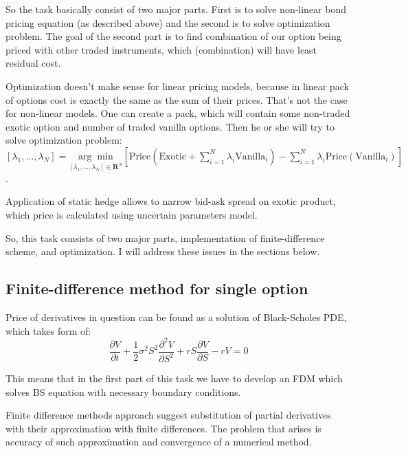 \documentclass[11pt]{article} %
\begin{document}
So the task basically consist of two major parts. First is to solve non-linear bond pricing equation (as described above) and the second is to solve optimization problem. The goal of the second part is to find combination of our option being priced with other traded instruments, which (combination) will have least residual cost. 

Optimization doesn't make sense for linear pricing models, because in linear pack of options cost is exactly the same as the sum of their prices. That's not the case for non-linear models. One can create a pack, which will contain some non-traded exotic option and number of traded vanilla options. Then he or she will try to solve optimization problem:\\ $[\lambda_1, ..., \lambda_N] = \underset{[\lambda_1, ..., \lambda_N]\in \mathbf{R}^N}{\arg \min} \left[\text{Price}\left(\text{Exotic} + \sum_{i=1}^{N}\lambda_i \text{Vanilla}_i\right) - \sum_{i=1}^N\lambda_i\text{Price}\left(\text{Vanilla}_i\right) \right]$.

Application of static hedge allows to narrow bid-ask spread on exotic product, which price is calculated using uncertain parameters model.

So, this task consists of two major parts, implementation of finite-difference scheme, and optimization. I will address these issues in the sections below.

\subsection{Finite-difference method for single option}
Price of derivatives in question can be found as a solution of Black-Scholes PDE, which takes form of:
\begin{equation}
\frac{\partial V}{\partial t} + \frac{1}{2}\sigma^2 S^2 \frac{\partial^2 V}{\partial S^2} +rS\frac{\partial V}{\partial S} - rV = 0
\end{equation}

This means that in the first part of this task we have to develop an FDM which solves BS equation with necessary boundary conditions. 

Finite difference methods approach suggest substitution of partial derivatives with their approximation with finite differences. The problem that arises is accuracy of such approximation and convergence of a numerical method.
\end{document}
